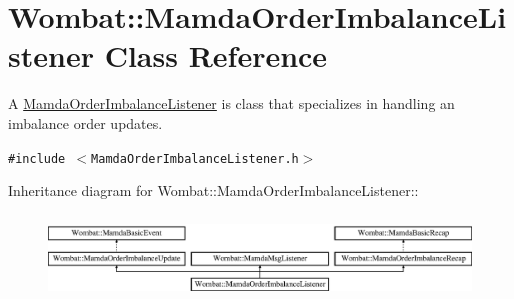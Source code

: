 \hypertarget{classWombat_1_1MamdaOrderImbalanceListener}{
\section{Wombat::Mamda\-Order\-Imbalance\-Listener Class Reference}
\label{classWombat_1_1MamdaOrderImbalanceListener}
}
A \hyperlink{classWombat_1_1MamdaOrderImbalanceListener}{Mamda\-Order\-Imbalance\-Listener} is class that specializes in handling an imbalance order updates.  


{\tt \#include $<$Mamda\-Order\-Imbalance\-Listener.h$>$}

Inheritance diagram for Wombat::Mamda\-Order\-Imbalance\-Listener::\begin{figure}[H]
\begin{center}
\leavevmode
\includegraphics[height=2.26721cm]{classWombat_1_1MamdaOrderImbalanceListener}
\end{center}
\end{figure}
